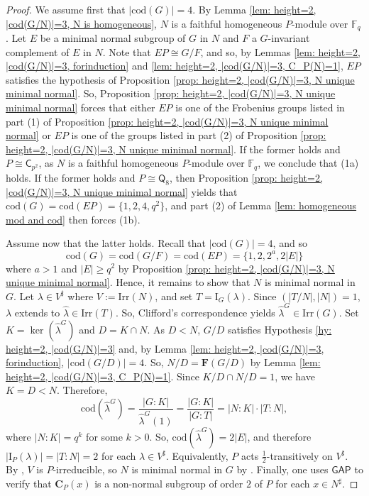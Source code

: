 \documentclass[9pt]{article}
\begin{document}
\begin{proof}
	We assume first that $|\mathrm{cod}(G)|=4$.
	By Lemma \ref{lem: height=2, |cod(G/N)|=3, N is homogeneous},
	$N$ is a faithful homogeneous $P$-module over $\mathbb{F}_q$.
    Let $E$ be a minimal normal subgroup of $G$ in $N$ and $F$ a $G$-invariant complement of $E$ in $N$.
	Note that $EP\cong G/F$,
	and so, by Lemmas \ref{lem: height=2, |cod(G/N)|=3, forinduction} and \ref{lem: height=2, |cod(G/N)|=3, C_P(N)=1},
	 $EP$ satisfies the hypothesis of Proposition  \ref{prop: height=2, |cod(G/N)|=3, N unique minimal normal}.
	So,
	Proposition \ref{prop: height=2, |cod(G/N)|=3, N unique minimal normal}
    forces that either $EP$ is one of the Frobenius groups listed in part (1) of Proposition \ref{prop: height=2, |cod(G/N)|=3, N unique minimal normal} or $EP$ is one of the groups listed in part (2) of Proposition \ref{prop: height=2, |cod(G/N)|=3, N unique minimal normal}.
	If the former holds and $P\cong \mathsf{C}_{p^{2}}$, as $N$ is a faithful homogeneous $P$-module over $\mathbb{F}_q$, we conclude that (1a) holds.
	If the former holds and $P\cong \mathsf{Q}_8$, 
	then Proposition \ref{prop: height=2, |cod(G/N)|=3, N unique minimal normal} 
	yields that 
	$\mathrm{cod}(G)=\mathrm{cod}(EP)=\{ 1,2,4, q^{2} \}$,
	and part (2) of Lemma \ref{lem: homogeneous mod and cod} 
    then forces (1b).

    
	Assume now that the latter holds.
	Recall that $|\mathrm{cod}(G)|=4$,
	and so 
	$$\mathrm{cod}(G)=\mathrm{cod}(G/F)=\mathrm{cod}(EP)=\{ 1,2,2^{a},2|E| \}$$
	 where $a>1$ and $|E|\geq q^{2}$ by Proposition \ref{prop: height=2, |cod(G/N)|=3, N unique minimal normal}.
	Hence, it remains to show that $N$ is minimal normal in $G$.
    Let $\lambda\in V^\sharp$ where $V:=\mathrm{Irr}(N)$, and set $T=\mathrm{I}_{G}(\lambda)$.
	Since $(|T/N|,|N|)=1$,
	$\lambda$ extends to $\hat{\lambda}\in \mathrm{Irr}(T)$.
	So, Clifford's correspondence yields $\hat{\lambda}^{G}\in \mathrm{Irr}(G)$.
	Set $K=\ker(\hat{\lambda}^{G})$ and $D=K\cap N$.
	As $D<N$, $G/D$ satisfies Hypothesis \ref{hy: height=2, |cod(G/N)|=3} and, by Lemma \ref{lem: height=2, |cod(G/N)|=3, forinduction}, 
	$|\mathrm{cod}(G/D)|=4$.
    So, $N/D=\mathbf{F}(G/D)$ by Lemma \ref{lem: height=2, |cod(G/N)|=3, C_P(N)=1}.
	Since $K/D\cap N/D=1$, we have $K=D< N$.
    Therefore,
	\[
	 \mathrm{cod}(\hat{\lambda}^{G})=\frac{|G:K|}{\hat{\lambda}^{G}(1)}=\frac{|G:K|}{|G:T|}=|N:K|\cdot |T:N|,
	\]
    where $|N:K|=q^{k}$ for some $k>0$.
	So, $\mathrm{cod}(\hat{\lambda}^{G})=2|E|$,
	and therefore
	$|\mathrm{I}_{P}(\lambda)|=|T:N|=2$ for each $\lambda\in V^\sharp$.
    Equivalently, $P$ acts $\frac{1}{2}$-transitively on $V^\sharp$.
	By \cite[Theorem I]{isaacspassman1966}, $V$ is $P$-irreducible,
	so $N$ is minimal normal in $G$ by \cite[Lemma 1]{zhang2000}.
	Finally, one uses $\mathsf{GAP}$ \cite{gap} to verify 
	that $\mathbf{C}_{P}(x)$ is a non-normal subgroup of order $2$ of $P$ for each $x\in N^\sharp$.


\end{proof}
\end{document}
